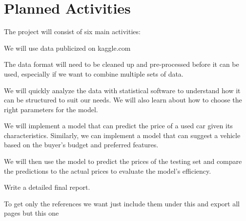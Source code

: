 \documentclass[12pt]{article}
\begin{document}
\section{Planned Activities}

The project will consist of six main activities:

\begin{description}[font=$\bullet$~\normalfont\scshape\color{red!50!black}]
\item [Collecting the dataset:] We will use data publicized on kaggle.com
\item [Data pre-processing:] The data format will need to be cleaned up and pre-processed before it can be used, especially if we want to combine multiple sets of data.
\item [Data exploration:] We will quickly analyze the data with statistical software to understand how it can be structured to suit our needs. We will also learn about how to choose the right parameters for the model.
\item [Building the model:] We will implement a model that can predict the price of a used car given its characteristics. Similarly, we can implement a model that can suggest a vehicle based on the buyer's budget and preferred features.
\item [Evaluation:] We will then use the model to predict the prices of the testing set and compare the predictions to the actual prices to evaluate the model's efficiency.
\item [Final report:] Write a detailed final report.
\end{description}




\newpage
To get only the references we want just include them under this and export all pages but this one
\cite{Gegic2019}
\cite{Samruddhia}
\cite{Chen2017a}
\cite{Pal2019}
\cite{Chandaka}
\end{document}
